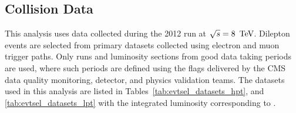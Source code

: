 \subsection{Collision Data}
\label{sec:evtsel_samples_data}
This analysis uses data collected during the 2012 run at $\sqrt{s} = 8\ \,\text{Te\hspace{-.08em}V}$.
Dilepton events are selected from primary datasets collected using electron and
muon trigger paths. Only runs and luminosity sections from good data taking
periods are used, where such periods are defined using the flags delivered by
the CMS data quality monitoring, detector, and physics validation teams. The
datasets used in this analysis are listed in Tables~\ref{tab:evtsel_datasets_hpt},
and \ref{tab:evtsel_datasets_lpt} with the integrated luminosity corresponding to
\usedLumi.

